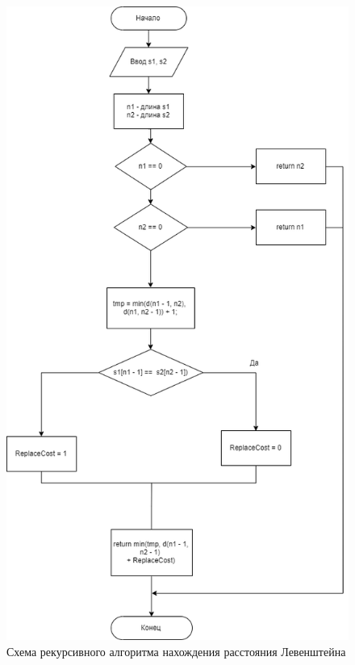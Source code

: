 \documentclass[12pt]{report}
\begin{document}
\begin{figure}[h]
\centering
\includegraphics[width=0.75\linewidth]{RecLev.png}
\caption{Схема рекурсивного алгоритма нахождения расстояния Левенштейна}
\label{fig:mpr}
\end{figure}
\end{document}
